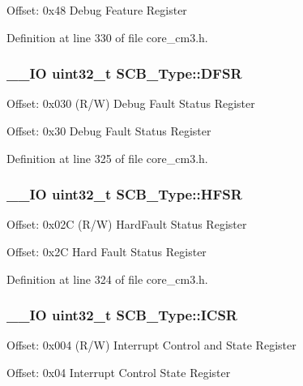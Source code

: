 Offset\-: 0x48 Debug Feature Register 

Definition at line 330 of file core\-\_\-cm3.\-h.

\hypertarget{struct_s_c_b___type_ad7d61d9525fa9162579c3da0b87bff8d}{
\subsubsection[{D\-F\-S\-R}]{\setlength{\rightskip}{0pt plus 5cm}\-\_\-\-\_\-\-I\-O {\bf uint32\-\_\-t} S\-C\-B\-\_\-\-Type\-::\-D\-F\-S\-R}}\label{struct_s_c_b___type_ad7d61d9525fa9162579c3da0b87bff8d}
Offset\-: 0x030 (R/\-W) Debug Fault Status Register

Offset\-: 0x30 Debug Fault Status Register 

Definition at line 325 of file core\-\_\-cm3.\-h.

\hypertarget{struct_s_c_b___type_a7bed53391da4f66d8a2a236a839d4c3d}{
\subsubsection[{H\-F\-S\-R}]{\setlength{\rightskip}{0pt plus 5cm}\-\_\-\-\_\-\-I\-O {\bf uint32\-\_\-t} S\-C\-B\-\_\-\-Type\-::\-H\-F\-S\-R}}\label{struct_s_c_b___type_a7bed53391da4f66d8a2a236a839d4c3d}
Offset\-: 0x02\-C (R/\-W) Hard\-Fault Status Register

Offset\-: 0x2\-C Hard Fault Status Register 

Definition at line 324 of file core\-\_\-cm3.\-h.

\hypertarget{struct_s_c_b___type_a3e66570ab689d28aebefa7e84e85dc4a}{
\subsubsection[{I\-C\-S\-R}]{\setlength{\rightskip}{0pt plus 5cm}\-\_\-\-\_\-\-I\-O {\bf uint32\-\_\-t} S\-C\-B\-\_\-\-Type\-::\-I\-C\-S\-R}}\label{struct_s_c_b___type_a3e66570ab689d28aebefa7e84e85dc4a}
Offset\-: 0x004 (R/\-W) Interrupt Control and State Register

Offset\-: 0x04 Interrupt Control State Register 

